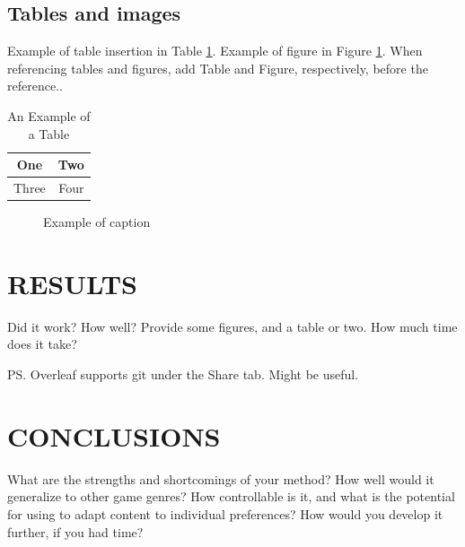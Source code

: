 \documentclass[letterpaper, 10 pt, conference]{ieeeconf}
\begin{document}
\subsection{Tables and images}

Example of table insertion in Table \ref{table_example}. Example of figure in Figure \ref{figurelabel}. When referencing tables and figures, add Table and Figure, respectively, before the reference..

\begin{table}[h]
\caption{An Example of a Table}
\label{table_example}
\begin{center}
\begin{tabular}{|c||c|}
\hline
One & Two\\
\hline
Three & Four\\
\hline
\end{tabular}
\end{center}
\end{table}


   \begin{figure}[thpb]
      \centering
      \caption{Example of caption}
      \label{figurelabel}
   \end{figure}
   
   
\section{RESULTS}

Did it work? How well? Provide some figures, and a table or two. How much time does it take?

PS. Overleaf supports git under the Share tab. Might be useful.

\section{CONCLUSIONS}

What are the strengths and shortcomings of your method? How well would it generalize to other game genres? How controllable is it, and what is the potential for using to adapt content to individual preferences? How would you develop it further, if you had time?



\addtolength{\textheight}{-12cm}  



\end{document}
